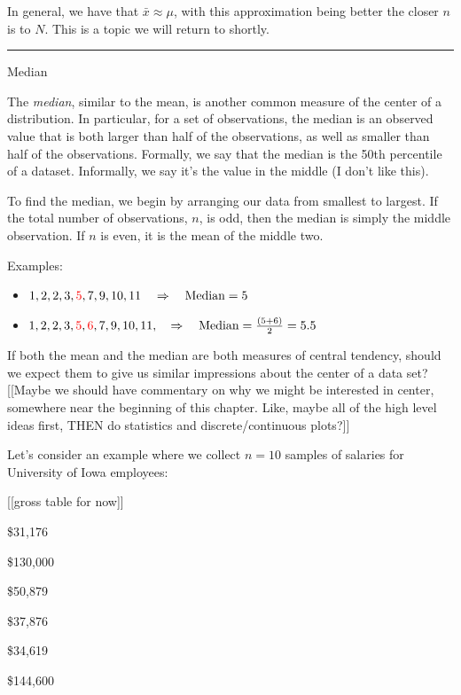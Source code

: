 \documentclass[
]{book}
\providecommand{\tightlist}{%
  \setlength{\itemsep}{0pt}\setlength{\parskip}{0pt}}
\theoremstyle{definition}
\theoremstyle{definition}
\theoremstyle{definition}
\theoremstyle{remark}
\begin{document}
In general, we have that \(\bar{x} \approx \mu\), with this approximation being better the closer \(n\) is to \(N\). This is a topic we will return to shortly.

\begin{center}\rule{0.5\linewidth}{0.5pt}\end{center}

Median

The \emph{median}, similar to the mean, is another common measure of the center of a distribution. In particular, for a set of observations, the median is an observed value that is both larger than half of the observations, as well as smaller than half of the observations. Formally, we say that the median is the 50th percentile of a dataset. Informally, we say it's the value in the middle (I don't like this).

To find the median, we begin by arranging our data from smallest to largest. If the total number of observations, \(n\), is odd, then the median is simply the middle observation. If \(n\) is even, it is the mean of the middle two.

Examples:

\begin{itemize}
\tightlist
\item
  \(1, 2, 2, 3, {\color{red} 5}, 7, 9, 10, 11 \quad \Rightarrow \quad \text{Median} = 5\)
\item
  \(1,2,2,3, {\color{red} 5}, {\color{red} 6}, 7, 9, 10, 11, \quad \Rightarrow \quad \text{Median} = \frac{(5+6)}{2} = 5.5\)
\end{itemize}

If both the mean and the median are both measures of central tendency, should we expect them to give us similar impressions about the center of a data set? {[}{[}Maybe we should have commentary on why we might be interested in center, somewhere near the beginning of this chapter. Like, maybe all of the high level ideas first, THEN do statistics and discrete/continuous plots?{]}{]}

Let's consider an example where we collect \(n = 10\) samples of salaries for University of Iowa employees:

{[}{[}gross table for now{]}{]}

\$31,176

\$130,000

\$50,879

\$37,876

\$34,619

\$144,600
\end{document}
